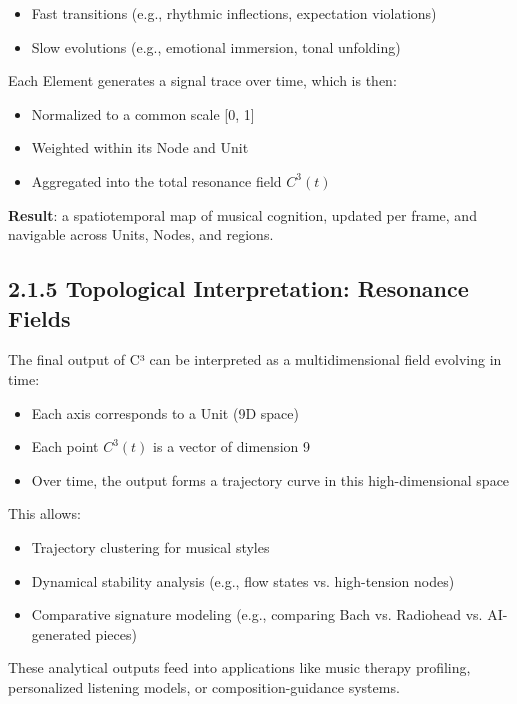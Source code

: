 \begin{itemize}
    \item Fast transitions (e.g., rhythmic inflections, expectation violations)
    \item Slow evolutions (e.g., emotional immersion, tonal unfolding)
\end{itemize}

Each Element generates a signal trace over time, which is then:

\begin{itemize}
    \item Normalized to a common scale [0, 1]
    \item Weighted within its Node and Unit
    \item Aggregated into the total resonance field $C^3(t)$
\end{itemize}

\textbf{Result}: a spatiotemporal map of musical cognition, updated per frame, and navigable across Units, Nodes, and regions.

\subsection*{2.1.5 Topological Interpretation: Resonance Fields}

The final output of C³ can be interpreted as a multidimensional field evolving in time:

\begin{itemize}
    \item Each axis corresponds to a Unit (9D space)
    \item Each point $C^3(t)$ is a vector of dimension 9
    \item Over time, the output forms a trajectory curve in this high-dimensional space
\end{itemize}

This allows:

\begin{itemize}
    \item Trajectory clustering for musical styles
    \item Dynamical stability analysis (e.g., flow states vs. high-tension nodes)
    \item Comparative signature modeling (e.g., comparing Bach vs. Radiohead vs. AI-generated pieces)
\end{itemize}

These analytical outputs feed into applications like music therapy profiling, personalized listening models, or composition-guidance systems.

